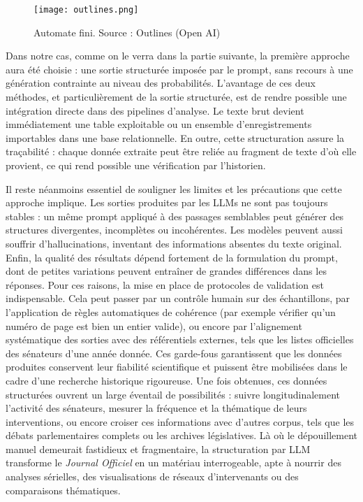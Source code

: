 \begin{figure}[htbp]
\centering
\texttt{[image: outlines.png]}
\caption{Automate fini. Source : Outlines (Open AI)}
\label{fig:outlines}
\end{figure}

Dans notre cas, comme on le verra dans la partie suivante, la première approche aura été choisie : une sortie structurée imposée par le prompt, sans recours à une génération contrainte au niveau des probabilités. L’avantage de ces deux méthodes, et particulièrement de la sortie structurée, est de rendre possible une intégration directe dans des pipelines d’analyse. Le texte brut devient immédiatement une table exploitable ou un ensemble d’enregistrements importables dans une base relationnelle. En outre, cette structuration assure la traçabilité : chaque donnée extraite peut être reliée au fragment de texte d’où elle provient, ce qui rend possible une vérification par l’historien.

Il reste néanmoins essentiel de souligner les limites et les précautions que cette approche implique. Les sorties produites par les LLMs ne sont pas toujours stables : un même prompt appliqué à des passages semblables peut générer des structures divergentes, incomplètes ou incohérentes. Les modèles peuvent aussi souffrir d’hallucinations, inventant des informations absentes du texte original. Enfin, la qualité des résultats dépend fortement de la formulation du prompt, dont de petites variations peuvent entraîner de grandes différences dans les réponses. Pour ces raisons, la mise en place de protocoles de validation est indispensable. Cela peut passer par un contrôle humain sur des échantillons, par l’application de règles automatiques de cohérence (par exemple vérifier qu’un numéro de page est bien un entier valide), ou encore par l’alignement systématique des sorties avec des référentiels externes, tels que les listes officielles des sénateurs d’une année donnée. Ces garde-fous garantissent que les données produites conservent leur fiabilité scientifique et puissent être mobilisées dans le cadre d’une recherche historique rigoureuse. Une fois obtenues, ces données structurées ouvrent un large éventail de possibilités : suivre longitudinalement l’activité des sénateurs, mesurer la fréquence et la thématique de leurs interventions, ou encore croiser ces informations avec d’autres corpus, tels que les débats parlementaires complets ou les archives législatives. Là où le dépouillement manuel demeurait fastidieux et fragmentaire, la structuration par LLM transforme le \emph{Journal Officiel} en un matériau interrogeable, apte à nourrir des analyses sérielles, des visualisations de réseaux d’intervenants ou des comparaisons thématiques.

